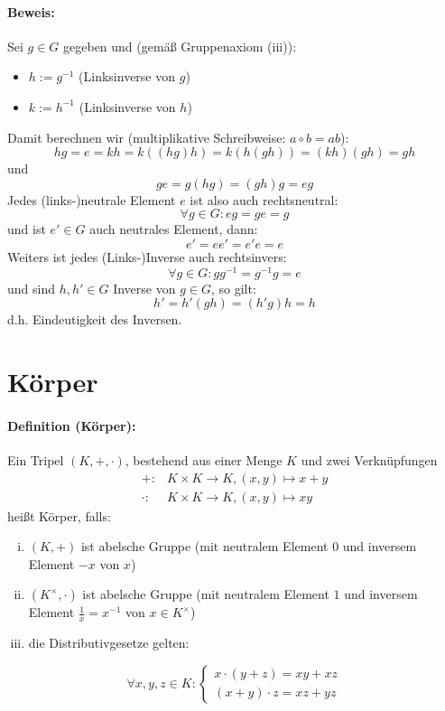 \documentclass[12pt,a4paper,parskip=half-,DIV=15]{scrreprt}
\begin{document}
\paragraph{Beweis:} Sei $g\in G$ gegeben und (gemäß Gruppenaxiom (iii)):
\begin{itemize}
\item $h:= g^{-1}$ (Linksinverse von $g$)
\item $k:= h^{-1}$ (Linksinverse von $h$)
\end{itemize}
Damit berechnen wir (multiplikative Schreibweise: $a\circ b = ab$):
\begin{equation*}
hg = e = kh = k((hg)h) = k(h(gh)) = (kh)(gh) = gh
\end{equation*}
und
\begin{equation*}
ge = g(hg) = (gh)g = eg
\end{equation*}
Jedes (links-)neutrale Element $e$ ist also auch rechtsneutral:
\begin{equation*}
\forall g\in G: eg = ge = g
\end{equation*}
und ist $e'\in G$ auch neutrales Element, dann:
\begin{equation*}
e' = ee' = e'e = e
\end{equation*}
Weiters ist jedes (Links-)Inverse auch rechtsinvers:
\begin{equation*}
\forall g \in G: gg^{-1}=g^{-1}g = e
\end{equation*}
und sind $h,h'\in G$ Inverse von $g\in G$, so gilt:
\begin{equation*}
h' = h'(gh) = (h'g)h = h
\end{equation*}
d.h. Eindeutigkeit des Inversen.

\section{Körper}
\paragraph{Definition (Körper):} Ein Tripel $(K,+,\cdot)$, bestehend aus einer Menge $K$ und zwei Verknüpfungen
\begin{align*}
+:&K\times K\to K,(x,y)\mapsto x+y\\
\cdot : &K\times K\to K, (x,y)\mapsto xy
\end{align*}
heißt Körper, falls:
\begin{enumerate}[(i)]
\item $(K,+)$ ist abelsche Gruppe (mit neutralem Element $0$ und inversem Element $-x$ von $x$)
\item $(K^\times,\cdot)$ ist abelsche Gruppe (mit neutralem Element $1$ und inversem Element $\frac{1}{x} = x^{-1}$ von $x\in K^\times$)
\item die Distributivgesetze gelten:
\end{enumerate}
\begin{equation*}
\forall x,y,z\in K :\begin{cases}x\cdot (y+z) = xy+xz\\ (x+y)\cdot z = xz+yz \end{cases}
\end{equation*}
\end{document}

